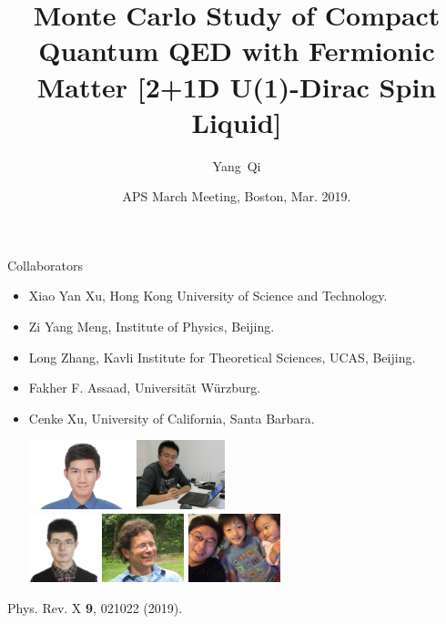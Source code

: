 \documentclass[xcolor=table, 10pt, aspectratio=169]{beamer}
\title[U1SL] %
{Monte Carlo Study of Compact Quantum QED with Fermionic Matter [2+1D U(1)-Dirac Spin Liquid]}
\author[Y Qi] %
{Yang~Qi}
\institute[Fudan] %
{
Department of Physics, Fudan University.
}
\date{APS March Meeting, Boston, Mar. 2019.}
\begin{document}
\begin{frame}
  \titlepage
\end{frame}

\begin{frame}{Collaborators}
\begin{itemize}
\item Xiao Yan Xu, Hong Kong University of Science and Technology.
\item Zi Yang Meng, Institute of Physics, Beijing.
\item Long Zhang, Kavli Institute for Theoretical Sciences, UCAS, Beijing.
\item Fakher F. Assaad, Universit\"at W\"urzburg.
\item Cenke Xu, University of California, Santa Barbara.
\begin{center}
  \includegraphics[height=2cm]{../people/xiaoyanxu}
  \includegraphics[height=2cm]{../people/ziyangmeng}\\
  \includegraphics[height=2cm]{../people/zhanglong}
  \includegraphics[height=2cm]{../people/fakher}
  \includegraphics[height=2cm]{../people/cenke}
\end{center}
\end{itemize}
\begin{center}
  \small Phys. Rev. X \textbf{9}, 021022 (2019).
\end{center}
\end{frame}
\end{document}
